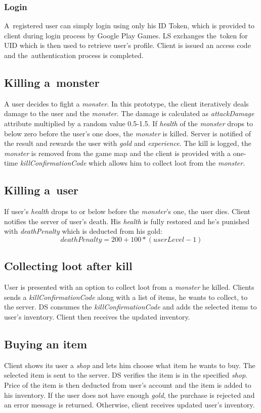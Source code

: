 		\subsubsection{Login}
		A~registered user can simply login using only his ID Token, which is provided to client during login process by Google Play Games. LS exchanges the~token for UID which is then used to retrieve user's profile. Client is issued an access code and the~authentication process is completed.
	
	\subsection{Killing a~monster}
	A user decides to fight a \textit{monster}. In this prototype, the client iteratively deals damage to the user and the \textit{monster}. The damage is calculated as \textit{attackDamage} attribute multiplied by a random value 0.5-1.5. If \textit{health} of the \textit{monster} drops to below zero before the user's one does, the \textit{monster} is killed. Server is notified of the result and rewards the user with \textit{gold} and \textit{experience}. The kill is logged, the \textit{monster} is removed from the game map and the client is provided with a one-time \textit{killConfirmationCode} which allows him to collect loot from the \textit{monster}.
		
	\subsection{Killing a~user}
	If user's \textit{health} drops to or below before the \textit{monster}'s one, the user dies. Client notifies the server of user's death. His \textit{health} is fully restored and he's punished with \textit{deathPenalty} which is deducted from his gold:  \[ deathPenalty = 200 + 100 * (userLevel - 1) \]
	
	\subsection{Collecting loot after kill}
	User is presented with an option to collect loot from a \textit{monster} he killed. Clients sends a \textit{killConfirmationCode} along with a list of items, he wants to collect, to the server. DS consumes the \textit{killConfirmationCode} and adds the selected items to user's inventory. Client then receives the updated inventory.
	
	\subsection{Buying an item}
	Client shows its user a \textit{shop} and lets him choose what item he wants to buy. The selected item is sent to the server. DS verifies the item is in the specified \textit{shop}. Price of the item is then deducted from user's account and the item is added to his inventory. If the user does not have enough \textit{gold}, the purchase is rejected and an error message is returned. Otherwise, client receives updated user's inventory.
	

